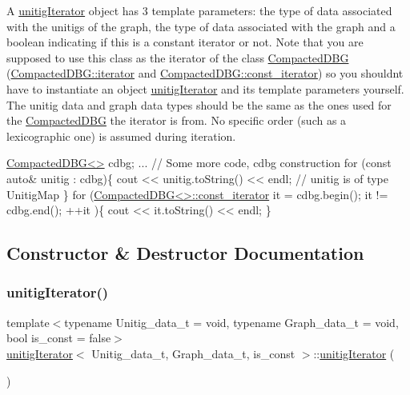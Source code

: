 A \hyperlink{classunitigIterator}{unitig\+Iterator} object has 3 template parameters\+: the type of data associated with the unitigs of the graph, the type of data associated with the graph and a boolean indicating if this is a constant iterator or not. Note that you are supposed to use this class as the iterator of the class \hyperlink{classCompactedDBG}{Compacted\+D\+BG} (\hyperlink{classCompactedDBG_af4a6df70628f698d9a2ee843b5359883}{Compacted\+D\+B\+G\+::iterator} and \hyperlink{classCompactedDBG_a7725fc78ad52227df1f70d9b8f44622c}{Compacted\+D\+B\+G\+::const\+\_\+iterator}) so you shouldn\textquotesingle{}t have to instantiate an object \hyperlink{classunitigIterator}{unitig\+Iterator} and its template parameters yourself. The unitig data and graph data types should be the same as the ones used for the \hyperlink{classCompactedDBG}{Compacted\+D\+BG} the iterator is from. No specific order (such as a lexicographic one) is assumed during iteration. 
\begin{DoxyCode}
\hyperlink{classCompactedDBG}{CompactedDBG<>} cdbg;
... \textcolor{comment}{// Some more code, cdbg construction}
\textcolor{keywordflow}{for} (\textcolor{keyword}{const} \textcolor{keyword}{auto}& unitig : cdbg)\{
  cout << unitig.toString() << endl; \textcolor{comment}{// unitig is of type UnitigMap}
\}
\textcolor{keywordflow}{for} (\hyperlink{classunitigIterator}{CompactedDBG<>::const\_iterator} it = cdbg.begin(); it != cdbg.end(); ++it
      )\{
  cout << it.toString() << endl;
\}
\end{DoxyCode}
 

\subsection{Constructor \& Destructor Documentation}
\mbox{\label{classunitigIterator_a1bd469cfd276720b53c56ba810fccea5}} 
\subsubsection{\texorpdfstring{unitig\+Iterator()}{unitigIterator()}\hspace{0.1cm}{\footnotesize\ttfamily [1/3]}}
{\footnotesize\ttfamily template$<$typename Unitig\+\_\+data\+\_\+t  = void, typename Graph\+\_\+data\+\_\+t  = void, bool is\+\_\+const = false$>$ \\
\hyperlink{classunitigIterator}{unitig\+Iterator}$<$ Unitig\+\_\+data\+\_\+t, Graph\+\_\+data\+\_\+t, is\+\_\+const $>$\+::\hyperlink{classunitigIterator}{unitig\+Iterator} (\begin{DoxyParamCaption}{ }\end{DoxyParamCaption})}



